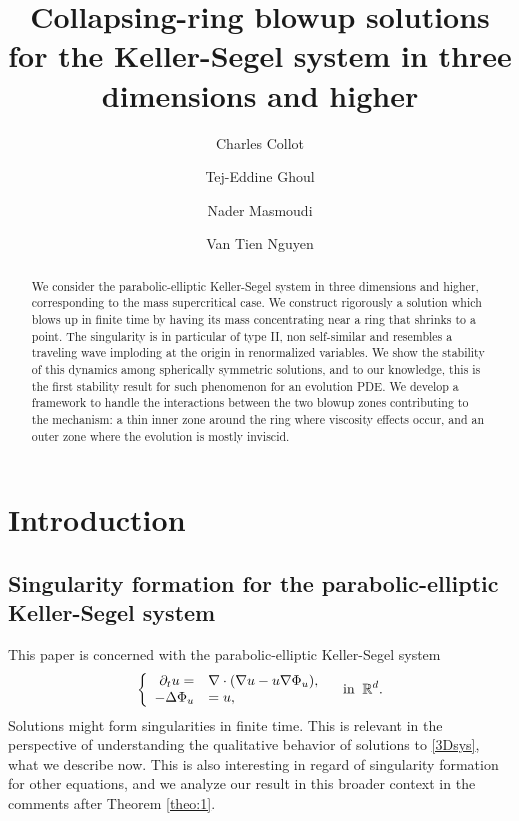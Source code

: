 \documentclass[11pt]{aims}
\title[Collapsing-ring blowup solutions for the Keller-Segel system] %
      {Collapsing-ring blowup solutions for the Keller-Segel system in three dimensions and higher}
\author[]{}
\author[C. Collot]{Charles Collot}
\author[T. Ghoul]{Tej-Eddine Ghoul}
\author[N. Masmoudi]{Nader Masmoudi}
\author[V. T. Nguyen]{Van Tien Nguyen}
\theoremstyle{definition}
\newcommand{\Rb}{\mathbb{R}}
\numberwithin{equation}{section}
\begin{document}
\maketitle




\begin{abstract} 

We consider the parabolic-elliptic Keller-Segel system in three dimensions and higher, corresponding to the mass supercritical case. We construct rigorously a solution which blows up in finite time by having its mass concentrating near a ring that shrinks to a point. The singularity is  in particular of type II, non self-similar and resembles a traveling wave imploding at the origin in renormalized variables. We show the stability of this dynamics among spherically symmetric solutions, and to our knowledge, this is the first stability result for such phenomenon for an evolution PDE. We develop a framework to handle the interactions between the two blowup zones contributing to the mechanism: a thin inner zone around the ring where viscosity effects occur, and an outer zone where the evolution is mostly inviscid.
\end{abstract}

\section{Introduction}

\subsection{Singularity formation for the parabolic-elliptic Keller-Segel system}

This paper is concerned with the parabolic-elliptic Keller-Segel system
\begin{equation}\label{3Dsys}
\left\{\begin{array}{rl}
 \partial_t u = &\nabla \cdot(\nabla u - u \nabla \Phi_u),\\
 -\Delta \Phi_u& = u,
\end{array}
 \right. \quad \textup{in}\;\; \Rb^d.
\end{equation}
Solutions might form singularities in finite time. This is relevant in the perspective of understanding the qualitative behavior of solutions to \eqref{3Dsys}, what we describe now. This is also interesting in regard of singularity formation for other equations, and we analyze our result in this broader context in the comments after Theorem \ref{theo:1}.\\
\end{document}
